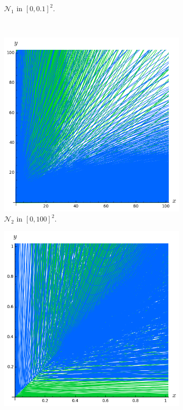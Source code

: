 \documentclass{beamer}
\begin{document}
\begin{frame}
\begin{figure}
\begin{subfigure}{.28\linewidth}
\vspace{-0.1cm}\caption{$\mathcal{N}_1$ in $[0, 0.1]^2$.}
\end{subfigure}\\[1ex]
\vspace{0.1cm}
\begin{subfigure}{.28\linewidth}\centering
\includegraphics[width=1\textwidth]{plots/ch5_newCurves4.png}
\vspace{-0.1cm}\caption{$\mathcal{N}_2$ in $[0, 100]^2$.}
\end{subfigure} \hspace{0.4cm}
\begin{subfigure}{.28\linewidth}\centering
\includegraphics[width=1\textwidth]{plots/ch5_newCurves3.png}

\end{subfigure}
\end{figure}
\end{frame}
\end{document}
